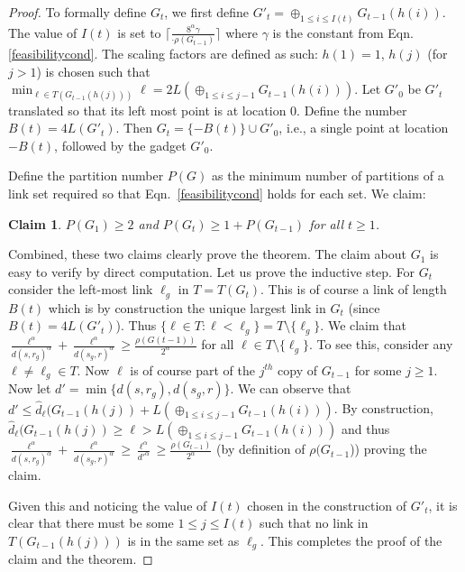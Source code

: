 \documentclass[11pt]{amsart}
\newcounter{foo}
\newtheorem{claim}[foo]{Claim}
\begin{document}
\begin{proof}
To formally define $G_t$, we first define $G'_t = \oplus_{1 \leq i \leq I(t)} G_{t -1}(h(i))$. The value of $I(t)$ is set to 
$\lceil \frac{8^{\alpha}  \gamma}{ \cdot \rho(G_{t -1})} \rceil$ where $\gamma$ is the constant from Eqn. \ref{feasibilitycond}. The scaling factors are defined as such: $h(1) = 1$, $h(j)$ (for $j > 1$) is chosen such that
$\min_{\ell \in T(G_{t -1}(h(j)))} \ell = 2 L(\oplus_{1 \leq i \leq j-1} G_{t -1}(h(i)))$. Let $G'_0$ be $G'_t$ translated so that its left most point is at location $0$. Define the number $B(t) = 4 L(G'_t)$. Then $G_t = \{-B(t)\} \cup G'_0$, i.e., a single point at location $-B(t)$, followed by the gadget $G'_0$. 

Define the partition number $P(G)$ as the minimum number of partitions of a link set required so that Eqn.~\ref{feasibilitycond}
holds for each set. We claim:
\begin{claim}
$P(G_1) \geq 2$ and $P(G_t) \geq 1 + P(G_{t-1})$ for all $t \geq 1$.
\end{claim}
Combined, these two claims clearly prove the theorem. The claim about $G_1$ is easy to verify by direct computation.
Let us prove the inductive step.
For $G_t$ consider the left-most link $\ell_g$ in $T = T(G_t)$. This is of course a link of length $B(t)$ which is by construction
the unique largest link in $G_t$ (since $B(t) = 4 L(G'_t)$). 
Thus $\{\ell \in T : \ell < \ell_g\} = T \setminus \{\ell_g\}$. 
We claim that
$\frac{\ell^{\alpha}}{d(s, r_g)^{\alpha}} +  \frac{\ell^{\alpha}}{d(s_g, r)^{\alpha}} \geq \frac{\rho(G(t-1))}{2^{\alpha}}$ for all $\ell \in T \setminus \{\ell_g\}$. To see this, consider any $\ell \neq \ell_g \in T$. 
Now $\ell$ is of course part of the $j^{th}$ copy of $G_{t-1}$ for some $j \geq 1$. 
Now let $d' = \min\{d(s, r_g), d(s_g, r)\}$.
We can  observe that 
$d' \leq \hat d_{\ell}(G_{t-1}(h(j)) + L(\oplus_{1 \leq i \leq j-1} G_{t -1}(h(i)))$. By construction, 
$\hat d_{\ell}(G_{t-1}(h(j)) \geq \ell > L(\oplus_{1 \leq i \leq j-1} G_{t -1}(h(i)))$ and thus 
$\frac{\ell^{\alpha}}{d(s, r_g)^{\alpha}} +  \frac{\ell^{\alpha}}{d(s_g, r)^{\alpha}} \geq  \frac{\ell^{\alpha}}{d'^{\alpha}} \geq \frac{\rho(G_{t-1})}{2^{\alpha}}$ (by definition of $\rho(G_{t-1}$)) proving the claim. 

Given this and noticing the value of $I(t)$ chosen in the construction of
$G'_t$, it is clear that there must be some $1 \leq j \leq I(t)$ such that no link in $T(G_{t-1}(h(j)))$
is in the same set as $\ell_g$. This completes the proof of the claim and the theorem.
\end{proof}
\end{document}
